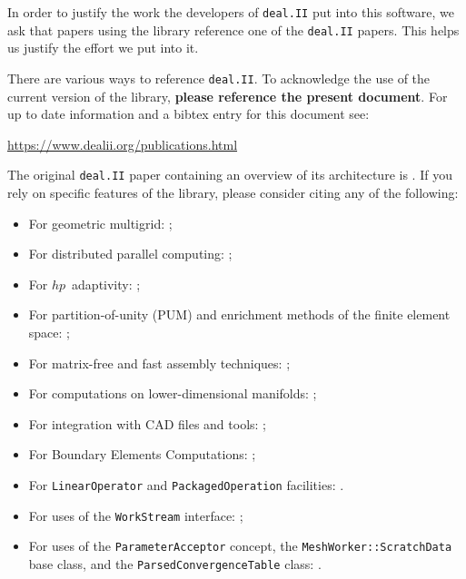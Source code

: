 \documentclass{ansarticle-preprint}
\newcommand{\specialword}[1]{\texttt{#1}}
\newcommand{\dealii}{{\specialword{deal.II}}\xspace}
\begin{document}
In order to justify the work the developers of \dealii put into this
software, we ask that papers using the library reference one of the
\dealii papers. This helps us justify the effort we put into it.

There are various ways to reference \dealii. To acknowledge the use of
the current version of the library, \textbf{please reference the present
document}. For up to date information and a bibtex entry for this document
see:
\begin{center}
 \url{https://www.dealii.org/publications.html}
\end{center}

The original \texttt{\dealii} paper containing an overview of its
architecture is \cite{BangerthHartmannKanschat2007}. If you rely on
specific features of the library, please consider citing any of the
following:
\begin{itemize}
 \item For geometric multigrid: \cite{Kanschat2004,JanssenKanschat2011,ClevengerHeisterKanschatKronbichler2019};
 \item For distributed parallel computing: \cite{BangerthBursteddeHeisterKronbichler11};
 \item For $hp$~adaptivity: \cite{BangerthKayserHerold2007};
  \item For partition-of-unity (PUM) and enrichment methods of the
    finite element space: \cite{Davydov2016};
 \item For matrix-free and fast assembly techniques:
   \cite{KronbichlerKormann2012,KronbichlerKormann2019};
 \item For computations on lower-dimensional manifolds:
   \cite{DeSimoneHeltaiManigrasso2009};
 \item For integration with CAD files and tools:
   \cite{HeltaiMola2015};
 \item For Boundary Elements Computations:
   \cite{GiulianiMolaHeltai-2018-a};
 \item For \texttt{LinearOperator} and \texttt{PackagedOperation} facilities:
   \cite{MaierBardelloniHeltai-2016-a,MaierBardelloniHeltai-2016-b}.
 \item For uses of the \texttt{WorkStream} interface:
   \cite{TKB16};
   \item For uses of the \texttt{ParameterAcceptor} concept, the
     \texttt{MeshWorker::ScratchData} base class, and the
     \texttt{ParsedConvergenceTable} class: \cite{SartoriGiulianiBardelloni-2018-a}.
\end{itemize}
\end{document}
